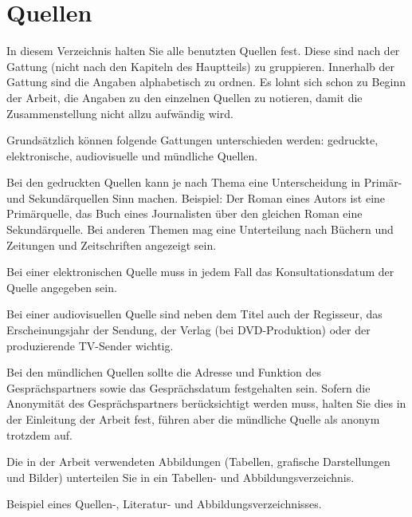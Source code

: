 \part{Quellen}

In diesem Verzeichnis halten Sie alle benutzten Quellen fest. Diese sind nach der Gattung (nicht nach den Kapiteln des Hauptteils) zu gruppieren. Innerhalb der Gattung sind die Angaben alphabetisch zu ordnen. Es lohnt sich schon zu Beginn der Arbeit, die Angaben zu den einzelnen Quellen zu notieren, damit die Zusammenstellung nicht allzu aufwändig wird. 

Grundsätzlich können folgende Gattungen unterschieden werden: gedruckte, elektronische, audiovisuelle und mündliche Quellen. 

Bei den gedruckten Quellen kann je nach Thema eine Unterscheidung in Primär- und Sekundärquellen Sinn machen. Beispiel: Der Roman eines Autors ist eine Primärquelle, das Buch eines Journalisten über den gleichen Roman eine Sekundärquelle. Bei anderen Themen mag eine Unterteilung nach Büchern und Zeitungen und Zeitschriften angezeigt sein. 

Bei einer elektronischen Quelle muss in jedem Fall das Konsultationsdatum der Quelle angegeben sein. 

Bei einer audiovisuellen Quelle sind neben dem Titel auch der Regisseur, das Erscheinungsjahr der Sendung, der Verlag (bei DVD-Produktion) oder der produzierende TV-Sender wichtig. 

Bei den mündlichen Quellen sollte die Adresse und Funktion des Gesprächspartners sowie das Gesprächsdatum festgehalten sein. Sofern die Anonymität des Gesprächspartners berücksichtigt werden muss, halten Sie dies in der Einleitung der Arbeit fest, führen aber die mündliche Quelle als anonym trotzdem auf. 

Die in der Arbeit verwendeten Abbildungen (Tabellen, grafische Darstellungen und Bilder) unterteilen Sie in ein Tabellen- und Abbildungsverzeichnis. 

Beispiel eines Quellen-, Literatur- und Abbildungsverzeichnisses.
